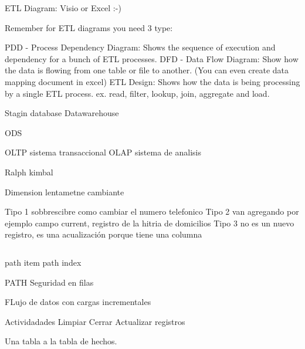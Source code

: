 ETL Diagram: Visio or Excel :-)

Remember for ETL diagrams you need 3 type:

PDD - Process Dependency Diagram: Shows the sequence of execution and dependency for a bunch of ETL processes.
DFD - Data Flow Diagram: Show how the data is flowing from one table or file to another. (You can even create data mapping document in excel)
ETL Design: Shows how the data is being processing by a single ETL process. ex. read, filter, lookup, join, aggregate and load.


Stagin database
Datawarehouse


ODS 

OLTP sistema transaccional
OLAP sistema de analisis

Ralph kimbal


Dimension lentametne cambiante

Tipo 1 sobbrescibre como cambiar el numero telefonico
Tipo 2 van agregando por ejemplo campo current, registro de la  hitria de domicilios
Tipo 3 no es un nuevo registro, es una acualización porque tiene una columna 

\begin{lstlisting}[numbers=none]
    % of Sales = DIVIDE([Asset AUM],CALCULATE([Asset AUM],ALL('Dimension')))
    \end{lstlisting}
     
    






    path item
path index


PATH 
Seguridad en filas

FLujo de datos con cargas incrementales

Actividadades
Limpiar 
Cerrar
Actualizar registros 


Una tabla a la tabla de hechos.

